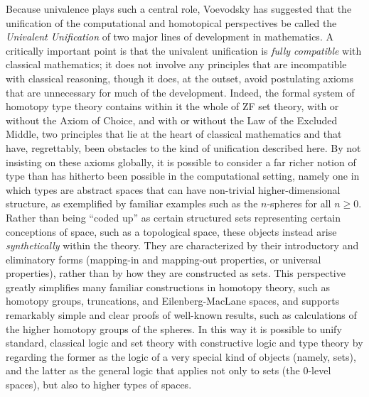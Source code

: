 \documentclass[11pt]{article}
\theoremstyle{remark}
\theoremstyle{definition}
\begin{document}
Because univalence plays such a central role, Voevodsky has suggested that the unification of the computational and
homotopical perspectives be called the \emph{Univalent Unification} of two major lines of development in mathematics.  A
critically important point is that the univalent unification is \emph{fully compatible} with classical mathematics; it
does not involve any principles that are incompatible with classical reasoning, though it does, at the outset, avoid
postulating axioms that are unnecessary for much of the development.  Indeed, the formal system of homotopy type theory
contains within it the whole of ZF set theory, with or without the Axiom of Choice, and with or without the Law of the
Excluded Middle, two principles that lie at the heart of classical mathematics and that have, regrettably, been
obstacles to the kind of unification described here.  By not insisting on these axioms globally, it is possible to
consider a far richer notion of type than has hitherto been possible in the computational setting, namely one in which
types are abstract spaces that can have non-trivial higher-dimensional structure, as exemplified by familiar examples
such as the $n$-spheres for all $n\geq 0$.  Rather than being ``coded up'' as certain structured sets representing
certain conceptions of space, such as a topological space, these objects instead arise \emph{synthetically} within the
theory.  They are characterized by their introductory and eliminatory forms (mapping-in and mapping-out properties, or
universal properties), rather than by how they are constructed as sets.  This perspective greatly simplifies many
familiar constructions in homotopy theory, such as homotopy groups, truncations, and Eilenberg-MacLane spaces, and
supports remarkably simple and clear proofs of well-known results, such as calculations of the higher homotopy groups of
the spheres.  In this way it is possible to unify standard, classical logic and set theory with constructive logic and
type theory by regarding the former as the logic of a very special kind of objects (namely, sets), and the latter as the
general logic that applies not only to sets (the $0$-level spaces), but also to higher types of spaces.
\end{document}
